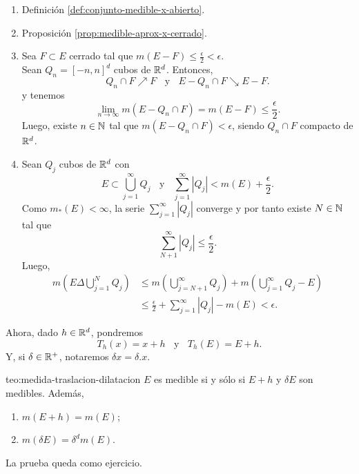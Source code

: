 \begin{demo}
\begin{enumerate}
    \item Definici\'on \ref{def:conjunto-medible-x-abierto}.
    \item Proposici\'on \ref{prop:medible-aprox-x-cerrado}.
    \item Sea $F\subset E$ cerrado tal que 
    $m(E-F)\leq \frac{\epsilon}{2}<\epsilon$. \\
    Sean $Q_n=[-n,n]^d$ cubos de $\mathbb{R}^d$. Entonces, 
    \[
    Q_n\cap F \nearrow F \;\; \mbox{ y }\;\; E-Q_n\cap F \searrow E-F.
    \]
 y tenemos
    \[
    \lim\limits_{n \to \infty}m\left(E-Q_n\cap F\right)=m(E-F)\leq \frac{\epsilon}{2}.
    \]
    Luego, existe $n\in \mathbb{N}$ tal que $m(E-Q_n\cap F)<\epsilon$, 
    siendo $Q_n\cap F$ compacto de $\mathbb{R}^d$.
    \item Sean $Q_j$ cubos de $\mathbb{R}^d$ con  
    \[
    E\subset \bigcup\limits_{j=1}^{\infty} Q_j\;\; \mbox{ y }\;\;
    \sum\limits_{j=1}^{\infty} |Q_j|<m(E)+\frac{\epsilon}{2}.
    \]
    Como $m_{*}(E)<\infty$, la serie $\sum\limits_{j=1}^{\infty} |Q_j|$
    converge y por tanto existe $N\in \mathbb{N}$ tal que 
    \[\sum\limits_{N+1}^{\infty} |Q_j|\leq \frac{\epsilon}{2}.\]
    Luego, 
    \[
    \begin{split}
    m\left(E\Delta \bigcup\limits_{j=1}^N Q_j\right)&\leq 
    m\left(\bigcup\limits_{j=N+1}^{\infty} Q_j\right)+m\left(\bigcup\limits_{j=1}^{\infty} Q_j-E\right)
    \\
    &\leq 
    \frac{\epsilon}{2}+\sum\limits_{j=1}^{\infty}|Q_j|-m(E)<
    \epsilon.
    \end{split}
    \]
    \end{enumerate}
\end{demo}

Ahora, dado $h\in \mathbb{R}^d$, pondremos
\[
T_h(x)=x+h\;\;\mbox{ y }\;\; T_h(E)=E+h.
\]
Y, si $\delta \in \mathbb{R}^+$, notaremos $\delta x=\delta {.} x$.

\begin{teorema}{teo:medida-traslacion-dilatacion}
$E$ es medible si y s\'olo si $E+h$  y $\delta E$ son medibles.
Adem\'as, 
\begin{enumerate}
    \item $m(E+h)=m(E)$;
    \item $m(\delta E)=\delta^d m(E)$.
\end{enumerate}
\end{teorema}

\begin{demo}
La prueba queda como ejercicio.
\end{demo}

